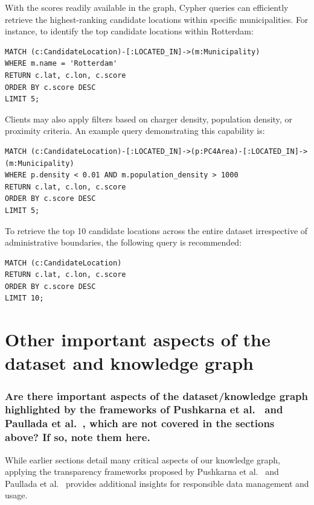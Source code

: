 \documentclass{article}
\newcommand{\question}[1]{#1}
\begin{document}
With the scores readily available in the graph, Cypher queries can efficiently retrieve the highest-ranking candidate locations within specific municipalities. For instance, to identify the top candidate locations within Rotterdam:

\begin{lstlisting}[style=cypherStyle,caption={Retrieve top 5 candidate locations in Rotterdam}label={lst:rotterdam_top5}]
MATCH (c:CandidateLocation)-[:LOCATED_IN]->(m:Municipality)
WHERE m.name = 'Rotterdam'
RETURN c.lat, c.lon, c.score
ORDER BY c.score DESC
LIMIT 5;
\end{lstlisting}

Clients may also apply filters based on charger density, population density, or proximity criteria. An example query demonstrating this capability is:

\begin{lstlisting}[style=cypherStyle,caption={Filtered query example}, label={lst:filtered_query}]
MATCH (c:CandidateLocation)-[:LOCATED_IN]->(p:PC4Area)-[:LOCATED_IN]->(m:Municipality)
WHERE p.density < 0.01 AND m.population_density > 1000
RETURN c.lat, c.lon, c.score
ORDER BY c.score DESC
LIMIT 5;
\end{lstlisting}

To retrieve the top 10 candidate locations across the entire dataset irrespective of administrative boundaries, the following query is recommended:

\begin{lstlisting}[style=cypherStyle,caption={Top 10 locations across the entire dataset}, label={lst:top10_global}]
MATCH (c:CandidateLocation)
RETURN c.lat, c.lon, c.score
ORDER BY c.score DESC
LIMIT 10;
\end{lstlisting}

\section{Other important aspects of the dataset and knowledge graph}

\question{\subsubsection*{Are there important aspects of the dataset/knowledge graph highlighted by the frameworks of Pushkarna et al.\ \cite{pushkarna} and Paullada et al.\ \cite{Paullada}, which are not covered in the sections above?  If so, note them here.}}

While earlier sections detail many critical aspects of our knowledge graph, applying the transparency frameworks proposed by Pushkarna et al.~\cite{pushkarna} and Paullada et al.~\cite{Paullada} provides additional insights for responsible data management and usage.
\end{document}
